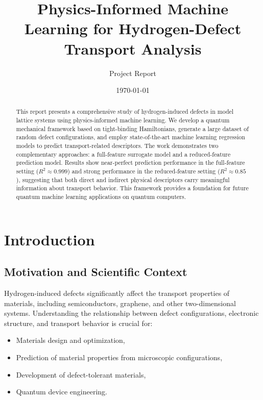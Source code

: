 \documentclass[11pt,a4paper]{article}
\title{\textbf{Physics-Informed Machine Learning for Hydrogen-Defect Transport Analysis}}
\author{Project Report}
\date{\today}
\begin{document}
\maketitle

\begin{abstract}
This report presents a comprehensive study of hydrogen-induced defects in model lattice systems using physics-informed machine learning. We develop a quantum mechanical framework based on tight-binding Hamiltonians, generate a large dataset of random defect configurations, and employ state-of-the-art machine learning regression models to predict transport-related descriptors. The work demonstrates two complementary approaches: a full-feature surrogate model and a reduced-feature prediction model. Results show near-perfect prediction performance in the full-feature setting ($R^2 \approx 0.999$) and strong performance in the reduced-feature setting ($R^2 \approx 0.85$), suggesting that both direct and indirect physical descriptors carry meaningful information about transport behavior. This framework provides a foundation for future quantum machine learning applications on quantum computers.
\end{abstract}

\newpage
\tableofcontents
\newpage

\section{Introduction}

\subsection{Motivation and Scientific Context}

Hydrogen-induced defects significantly affect the transport properties of materials, including semiconductors, graphene, and other two-dimensional systems. Understanding the relationship between defect configurations, electronic structure, and transport behavior is crucial for:

\begin{itemize}
    \item Materials design and optimization,
    \item Prediction of material properties from microscopic configurations,
    \item Development of defect-tolerant materials,
    \item Quantum device engineering.
\end{itemize}
\end{document}
